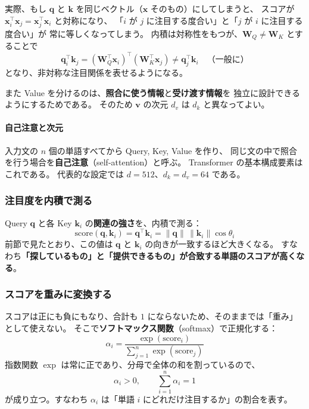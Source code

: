 実際、もし $\bm{q}$ と $\bm{k}$ を同じベクトル（$\bm{x}$ そのもの）にしてしまうと、
スコアが $\bm{x}_i^\top \bm{x}_j = \bm{x}_j^\top \bm{x}_i$ と対称になり、
「$i$ が $j$ に注目する度合い」と「$j$ が $i$ に注目する度合い」が
常に等しくなってしまう。
内積は対称性をもつが、$\bm{W}_Q \neq \bm{W}_K$ とすることで
\begin{equation}
  \bm{q}_i^\top \bm{k}_j = (\bm{W}_Q^\top \bm{x}_i)^\top (\bm{W}_K^\top \bm{x}_j)
  \neq \bm{q}_j^\top \bm{k}_i \quad \text{（一般に）}
\end{equation}
となり、非対称な注目関係を表せるようになる。

また Value を分けるのは、\textbf{照合に使う情報}と\textbf{受け渡す情報}を
独立に設計できるようにするためである。
そのため $\bm{v}$ の次元 $d_v$ は $d_k$ と異なってよい。

\paragraph{自己注意と次元}
入力文の $n$ 個の単語すべてから Query, Key, Value を作り、
同じ文の中で照合を行う場合を\textbf{自己注意}（self-attention）と呼ぶ。
Transformer の基本構成要素はこれである。
代表的な設定では $d = 512$、$d_k = d_v = 64$ である。

\subsubsection{注目度を内積で測る}

Query $\bm{q}$ と各 Key $\bm{k}_i$ の\textbf{関連の強さ}を、内積で測る：
\begin{equation}
  \mathrm{score}(\bm{q}, \bm{k}_i) = \bm{q}^\top \bm{k}_i
  = \|\bm{q}\| \, \|\bm{k}_i\| \cos\theta_i
\end{equation}
前節で見たとおり、この値は $\bm{q}$ と $\bm{k}_i$ の向きが一致するほど大きくなる。
すなわち\textbf{「探しているもの」と「提供できるもの」が合致する単語のスコアが高くなる}。

\subsubsection{スコアを重みに変換する}

スコアは正にも負にもなり、合計も $1$ にならないため、そのままでは「重み」として使えない。
そこで\textbf{ソフトマックス関数}（softmax）で正規化する：
\begin{equation}
  \alpha_i = \frac{\exp(\mathrm{score}_i)}{\sum_{j=1}^{n} \exp(\mathrm{score}_j)}
\end{equation}
指数関数 $\exp$ は常に正であり、分母で全体の和を割っているので、
\begin{equation}
  \alpha_i > 0, \qquad \sum_{i=1}^{n} \alpha_i = 1
\end{equation}
が成り立つ。すなわち $\alpha_i$ は「単語 $i$ にどれだけ注目するか」の割合を表す。


